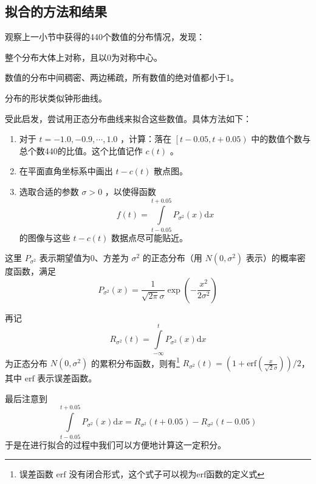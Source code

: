     \subsection{拟合的方法和结果}

        观察上一小节中获得的440个数值的分布情况，发现：
        \begin{asparaitem}
            \item 整个分布大体上对称，且以$0$为对称中心。
            \item 数值的分布中间稠密、两边稀疏，所有数值的绝对值都小于1。
            \item 分布的形状类似钟形曲线。
        \end{asparaitem}
        
        \vspace{1.5ex}

        受此启发，尝试用正态分布曲线来拟合这些数值。具体方法如下：
        \begin{enumerate}[leftmargin=6em]
            \item [\textbf{步骤 1.}] 对于 $t=-1.0,-0.9,\cdots,1.0$ ，计算：落在 $\left[t-0.05,t+0.05\right)$ 中的数值个数与总个数440的比值。这个比值记作 $c(t)$ 。
            \item [\textbf{步骤 2.}] 在平面直角坐标系中画出 $t-c(t)$ 散点图。
            \item [\textbf{步骤 3.}] 选取合适的参数 $\sigma>0$ ，以使得函数 $$ f(t)=\displaystyle\int\limits_{t-0.05}^{t+0.05} P_{\sigma^2}(x)\mathrm{d} x$$ 的图像与这些 $t-c(t)$ 数据点尽可能贴近。
        \end{enumerate}

        这里 $P_{\sigma^2}$ 表示期望值为0、方差为 $\sigma^2$ 的正态分布（用 $N(0,\sigma^2)$ 表示）的概率密度函数，满足 $$P_{\sigma^2}(x)=\frac{1}{\sqrt{2\pi}\sigma}\exp{\left(-\frac{x^2}{2\sigma^2}\right)}$$

        再记 $$R_{\sigma^2}(t)=\int\limits_{-\infty}^t P_{\sigma^2}(x)\mathrm{d}x$$ 为正态分布 $N(0,\sigma^2)$ 的累积分布函数，则有\footnote{误差函数 $\mathrm{erf}$ 没有闭合形式，这个式子可以视为$\mathrm{erf}$函数的定义式} $R_{\sigma^2}(t)=\left(1+\mathrm{erf}\left(\frac x{\sqrt{2}\sigma}\right)\right)/2$\nobreak，其中 $\mathrm{erf}$ 表示误差函数。

        最后注意到 $$\int\limits_{t-0.05}^{t+0.05} P_{\sigma^2}(x)\mathrm{d} x=R_{\sigma^2}(t+0.05)-R_{\sigma^2}(t-0.05)$$ 于是在进行拟合的过程中我们可以方便地计算这一定积分。

